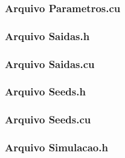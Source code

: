 \newpage

\subsubsection{Arquivo Parametros.cu}



\newpage

\subsubsection{Arquivo Saidas.h}



\newpage

\subsubsection{Arquivo Saidas.cu}



\newpage

\subsubsection{Arquivo Seeds.h}



\newpage

\subsubsection{Arquivo Seeds.cu}



\newpage

\subsubsection{Arquivo Simulacao.h}



\newpage

